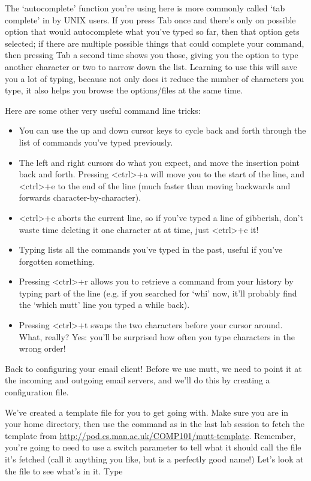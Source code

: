 The `autocomplete' function you're using here is more commonly called `tab complete' in by UNIX users. If you press Tab once and there's only on possible option that would autocomplete what you've typed so far, then that option gets selected; if there are multiple possible things that could complete your command, then pressing Tab a second time shows you those, giving you the option to type another character or two to narrow down the list. Learning to use this will save you a lot of typing, because not only does it reduce the number of characters you type, it also helps you browse the options/files at the same time. 

Here are some other very useful command line tricks:

\begin{itemize}
\item You can use the up and down cursor keys to cycle back and forth through the list of commands you've typed previously.
\item The left and right cursors do what you expect, and move the insertion point back and forth. Pressing <ctrl>+a will move you to the start of the line, and <ctrl>+e to the end of the line (much faster than moving backwards and forwards character-by-character). 
\item <ctrl>+c aborts the current line, so if you've typed a line of gibberish, don't waste time deleting it one character at at time, just <ctrl>+c it!
\item Typing  lists all the commands you've typed in the past, useful if you've forgotten something.
\item Pressing <ctrl>+r allows you to retrieve a command from your history by typing part of the line (e.g. if you searched for `whi' now, it'll probably find the `which mutt' line you typed a while back). 
\item Pressing <ctrl>+t swaps the two characters before your cursor around. What, really? Yes: you'll be surprised how often you type characters in the wrong order! 
\end{itemize}

Back to configuring your email client! Before we use mutt, we need to point it at the incoming and outgoing email servers, and we'll do this by creating a configuration file.

We've created a template file for you to get going with. Make sure you are in your home directory, then use the  command as in the last lab session to fetch the template from \url{http://pod.cs.man.ac.uk/COMP101/mutt-template}. Remember, you're going to need to use a switch parameter to tell  what it should call the file it's fetched (call it anything you like, but  is a perfectly good name!) Let's look at the file to see what's in it. Type

